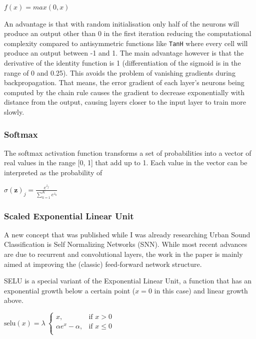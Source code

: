 {\centering
	$\displaystyle f(x)=max(0, x)$\par
}


An advantage is that with random initialisation only half of the neurons will produce an output other than 0 in the first iteration reducing the computational complexity compared to antisymmetric functions like \texttt{TanH} where every cell will produce an output between -1 and 1.
The main advantage however is that the derivative of the identity function is 1 (differentiation of the sigmoid is in the range of 0 and 0.25). This avoids the problem of vanishing gradients \cite{Hochreiter:01book} during backpropagation. That means, the error gradient of each layer's neurons being computed by the chain rule causes the gradient to decrease exponentially with distance from the output, causing layers closer to the input layer to train more slowly.


\subsubsection{Softmax}
The softmax activation function transforms a set of probabilities into a vector of real values in the range [0, 1] that add up to 1. Each value in the vector can be interpreted as the probability of 

{\centering
	$\displaystyle \sigma (\mathbf {z} )_{j}={\frac {e^{z_{j}}}{\sum _{k=1}^{K}e^{z_{k}}}}$
	\par
}


\subsubsection{Scaled Exponential Linear Unit}

A new concept that was published while I was already researching Urban Sound Classification is Self Normalizing Networks (SNN). While most recent advances are due to  recurrent and convolutional layers, the work in the paper \cite{DBLP:journals/corr/KlambauerUMH17} is mainly aimed at improving the (classic) feed-forward network structure.

SELU is a special variant of the Exponential Linear Unit, a function that has an exponential growth below a certain point ($x = 0$ in this case) and linear growth above. 
 


{\centering
	$\displaystyle \text{selu}(x) = \lambda\ \begin{cases}
    x,& \text{if } x > 0\\
    \alpha e^{x} - \alpha,& \text{if } x\leq 0\\
	\end{cases}$
	\par
}

